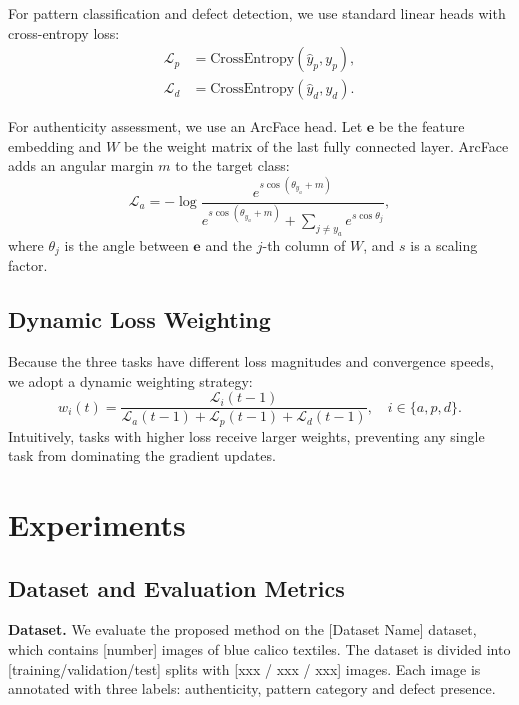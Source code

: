 \documentclass[preprint,12pt,a4paper]{elsarticle}
\begin{document}
For pattern classification and defect detection, we use standard linear heads with cross-entropy loss:
\begin{align}
    \mathcal{L}_p &= \text{CrossEntropy}(\hat{y}_p, y_p), \\
    \mathcal{L}_d &= \text{CrossEntropy}(\hat{y}_d, y_d).
\end{align}

For authenticity assessment, we use an ArcFace head.
Let $\mathbf{e}$ be the feature embedding and $W$ be the weight matrix of the last fully connected layer.
ArcFace adds an angular margin $m$ to the target class:
\begin{equation}
    \mathcal{L}_a = -\log \frac{e^{s \cos(\theta_{y_a} + m)}}{e^{s \cos(\theta_{y_a} + m)} + \sum_{j \neq y_a} e^{s \cos \theta_j}},
\end{equation}
where $\theta_j$ is the angle between $\mathbf{e}$ and the $j$-th column of $W$, and $s$ is a scaling factor.

\subsection{Dynamic Loss Weighting}

Because the three tasks have different loss magnitudes and convergence speeds, we adopt a dynamic weighting strategy:
\begin{equation}
    w_i(t) = \frac{\mathcal{L}_i(t-1)}{\mathcal{L}_a(t-1) + \mathcal{L}_p(t-1) + \mathcal{L}_d(t-1)}, \quad i \in \{a, p, d\}.
\end{equation}
Intuitively, tasks with higher loss receive larger weights, preventing any single task from dominating the gradient updates.

\section{Experiments}\label{sec:experiments}

\subsection{Dataset and Evaluation Metrics}

\textbf{Dataset.}
We evaluate the proposed method on the [Dataset Name] dataset, which contains [number] images of blue calico textiles.
The dataset is divided into [training/validation/test] splits with [xxx / xxx / xxx] images.
Each image is annotated with three labels: authenticity, pattern category and defect presence.
\end{document}
